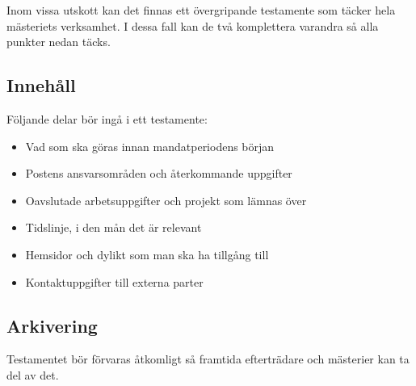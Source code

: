 \documentclass[]{dsekkallelse}
\begin{document}
Inom vissa utskott kan det finnas ett övergripande testamente som täcker hela mästeriets verksamhet. I dessa fall kan de två komplettera varandra så alla punkter nedan täcks.

\subsection{Innehåll}
Följande delar bör ingå i ett testamente:
\begin{itemize}
    \item Vad som ska göras innan mandatperiodens början
    \item Postens ansvarsområden och återkommande uppgifter
    \item Oavslutade arbetsuppgifter och projekt som lämnas över
    \item Tidslinje, i den mån det är relevant
    \item Hemsidor och dylikt som man ska ha tillgång till
    \item Kontaktuppgifter till externa parter
\end{itemize}

\subsection{Arkivering}
Testamentet bör förvaras åtkomligt så framtida efterträdare och mästerier kan ta del av det.
\end{document}
